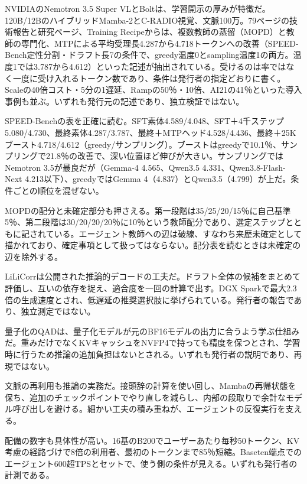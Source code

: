 \documentclass[lualatex,a4paper,10pt]{jlreq}
\begin{document}
NVIDIAのNemotron 3.5 Super VLとBoltは、学習開示の厚みが特徴だ。120B/12BのハイブリッドMamba-2とC-RADIO視覚、文脈100万。79ページの技術報告と研究ページ、Training Recipeからは、複数教師の蒸留（MOPD）と教師の専門化、MTPによる平均受理長4.287から4.718トークンへの改善（SPEED-Bench定性分割・ドラフト長7の条件で、greedy温度0とsampling温度1の両方。温度1では3.787から4.612）といった記述が抽出されている。受けるのは率ではなく一度に受け入れるトークン数であり、条件は発行者の指定どおりに書く。Scaleの40倍コスト・5分の1遅延、Rampの50％・10倍、AI21の41％といった導入事例も並ぶ。いずれも発行元の記述であり、独立検証ではない。
\cite{B21,B72,B22,B20,B60}


SPEED-Benchの表を正確に読む。SFT素体4.589/4.048、SFT＋4千ステップ5.080/4.730、最終素体4.287/3.787、最終＋MTPヘッド4.528/4.436、最終＋25Kブースト4.718/4.612（greedy/サンプリング）。ブーストはgreedyで10.1％、サンプリングで21.8％の改善で、深い位置ほど伸びが大きい。サンプリングではNemotron 3.5が最良だが（Gemma-4 4.565、Qwen3.5 4.331、Qwen3.8-Flash-Next 4.213以下）、greedyではGemma 4（4.837）とQwen3.5（4.799）が上だ。条件ごとの順位を混ぜない。
\cite{B21,B72,B22,B20,B60}


MOPDの配分と未確定部分も押さえる。第一段階は35/25/20/15％に自己基準5％、第二段階は30/20/20/20％に10％という教師配分であり、選定ステップとともに記されている。エージェント教師への辺は破線、すなわち来歴未確定として描かれており、確定事項として扱ってはならない。配分表を読むときは未確定の辺を除外する。
\cite{B21,B72,B22,B20}


LiLiCorrは公開された推論的デコードの工夫だ。ドラフト全体の候補をまとめて評価し、互いの依存を捉え、適合度を一回の計算で出す。DGX Sparkで最大2.3倍の生成速度とされ、低遅延の推奨選択肢に挙げられている。発行者の報告であり、独立測定ではない。
\cite{B21,B72,B22,B20}


量子化のQADは、量子化モデルが元のBF16モデルの出力に合うよう学ぶ仕組みだ。重みだけでなくKVキャッシュをNVFP4で持っても精度を保つとされ、学習時に行うため推論の追加負担はないとされる。いずれも発行者の説明であり、再現ではない。
\cite{B21,B72,B22,B20}


文脈の再利用も推論の実務だ。接頭辞の計算を使い回し、Mambaの再帰状態を保ち、追加のチェックポイントでやり直しを減らし、内部の段取りで余計なモデル呼び出しを避ける。細かい工夫の積み重ねが、エージェントの反復実行を支える。
\cite{B21,B72,B22,B20}


配備の数字も具体性が高い。16基のB200でユーザーあたり毎秒50トークン、KV考慮の経路づけで8倍の利用者、最初のトークンまで85％短縮。Baseten端点でのエージェント600超TPSとセットで、使う側の条件が見える。いずれも発行者の計測である。
\cite{B21,B72,B22,B20}
\end{document}
